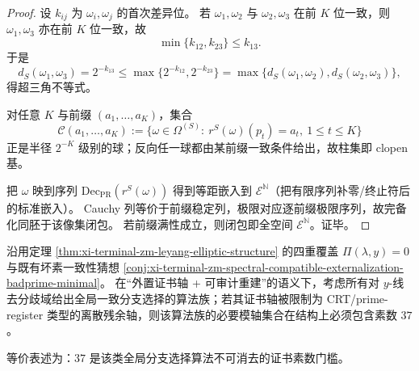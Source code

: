\begin{proof}
设 \(k_{ij}\) 为 \(\omega_i,\omega_j\) 的首次差异位。
若 \(\omega_1,\omega_2\) 与 \(\omega_2,\omega_3\) 在前 \(K\) 位一致，则 \(\omega_1,\omega_3\) 亦在前 \(K\) 位一致，故
\[
\min\{k_{12},k_{23}\}\le k_{13}.
\]
于是
\[
d_S(\omega_1,\omega_3)=2^{-k_{13}}
\le
\max\{2^{-k_{12}},2^{-k_{23}}\}
=
\max\{d_S(\omega_1,\omega_2),d_S(\omega_2,\omega_3)\},
\]
得超三角不等式。

对任意 \(K\) 与前缀 \((a_1,\dots,a_K)\)，集合
\[
\mathcal C(a_1,\dots,a_K):=
\{\omega\in\Omega^{(S)}:\ r^S(\omega)(p_t)=a_t,\ 1\le t\le K\}
\]
正是半径 \(2^{-K}\) 级别的球；反向任一球都由某前缀一致条件给出，故柱集即 clopen 基。

把 \(\omega\) 映到序列 \(\mathrm{Dec}_{\mathrm{PR}}(r^S(\omega))\) 得到等距嵌入到 \(\mathcal E^{\mathbb N}\)（把有限序列补零/终止符后的标准嵌入）。
Cauchy 列等价于前缀稳定列，极限对应逐前缀极限序列，故完备化同胚于该像集闭包。
若前缀满性成立，则闭包即全空间 \(\mathcal E^{\mathbb N}\)。证毕。
\end{proof}

\begin{conjecture}\label{conj:xi-leyang-badprime37-algorithmic-threshold}
沿用定理 \ref{thm:xi-terminal-zm-leyang-elliptic-structure} 的四重覆盖 \(\Pi(\lambda,y)=0\) 与既有坏素一致性猜想 \ref{conj:xi-terminal-zm-spectral-compatible-externalization-badprime-minimal}。
在“外置证书轴 + 可审计重建”的语义下，考虑所有对 \(y\)-线去分歧域给出全局一致分支选择的算法族；若其证书轴被限制为 CRT/prime-register 类型的离散残余轴，则该算法族的必要模轴集合在结构上必须包含素数 \(37\)。

等价表述为：\(37\) 是该类全局分支选择算法不可消去的证书素数门槛。
\end{conjecture}
